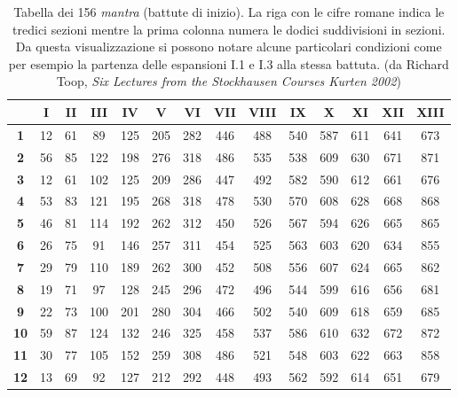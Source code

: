 \begin{table}[htp]
\begin{center}
\begin{sf}{\footnotesize
\begin{tabular}{|c|c|c|c|c|c|c|c|c|c|c|c|c|c|}

\hline
  & \textbf{I} & \textbf{II} & \textbf{III} & \textbf{IV} & \textbf{V} & \textbf{VI} & \textbf{VII} & \textbf{VIII} & \textbf{IX} & \textbf{X} & \textbf{XI} & \textbf{XII} & \textbf{XIII} \\
  \hline
  \hline
\textbf{1} & 12 & 61 & 89 & 125 & 205 & 282 & 446 & 488 & 540 & 587 & 611 & 641 & 673 \\
\hline
\textbf{2} & 56 & 85 & 122 & 198 & 276 & 318 & 486 & 535 & 538 & 609 & 630 & 671 & 871 \\
\hline
\textbf{3} & 12 & 61 & 102 & 125 & 209 & 286 & 447 & 492 & 582 & 590 & 612 & 661 & 676 \\
\hline
\textbf{4} &  53 & 83 & 121 & 195 & 268 & 318 & 478 & 530 & 570 & 608 & 628 & 668 & 868 \\
\hline
\textbf{5} & 46 & 81 & 114 & 192 & 262 & 312 & 450 & 526 & 567 & 594 & 626 & 665 & 865 \\
\hline
\textbf{6} & 26 & 75 & 91 & 146 & 257 & 311 & 454 & 525 & 563 & 603 & 620 & 634 & 855 \\
\hline
\textbf{7} & 29 & 79 & 110 & 189 & 262 & 300 & 452 & 508 & 556 & 607 & 624 & 665 & 862 \\
\hline
\textbf{8} & 19 & 71 & 97 & 128 & 245 & 296 & 472 & 496 & 544 & 599 & 616 & 656 & 681 \\
\hline
\textbf{9} & 22 & 73 & 100 & 201 & 280 & 304 & 466 & 502 & 540 & 609 & 618 & 659 & 685 \\
\hline
\textbf{10} & 59 & 87 & 124 & 132 & 246 & 325 & 458 & 537 & 586 & 610 & 632 & 672 & 872 \\
\hline
\textbf{11} & 30 & 77 & 105 & 152 & 259 & 308 & 486 & 521 & 548 & 603 & 622 & 663 & 858 \\
\hline
\textbf{12} & 13 & 69 & 92 & 127 & 212 & 292 & 448 & 493 & 562 & 592 & 614 & 651 & 679 \\
\hline

\end{tabular}}
\end{sf}
\end{center}
\caption{Tabella dei 156 \emph{mantra} (battute di inizio). La riga con le cifre romane indica le tredici sezioni mentre la prima colonna numera le dodici suddivisioni in sezioni. Da questa visualizzazione si possono notare alcune particolari condizioni come per esempio la partenza delle espansioni I.1 e I.3 alla stessa battuta. (da Richard Toop, \emph{Six Lectures from the Stockhausen Courses Kurten 2002})}

\label{default}
\end{table}%

